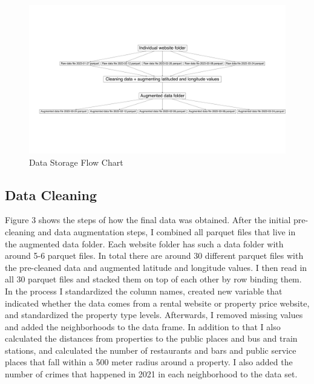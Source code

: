 \documentclass[
]{article}
\begin{document}
\begin{figure}
\centering
\includegraphics{final_report_files/figure-latex/unnamed-chunk-3-1.pdf}
\caption{Data Storage Flow Chart}
\end{figure}

\hypertarget{data-cleaning}{%
\subsection{Data Cleaning}\label{data-cleaning}}

Figure 3 shows the steps of how the final data was obtained. After the
initial pre-cleaning and data augmentation steps, I combined all parquet
files that live in the augmented data folder. Each website folder has
such a data folder with around 5-6 parquet files. In total there are
around 30 different parquet files with the pre-cleaned data and
augmented latitude and longitude values. I then read in all 30 parquet
files and stacked them on top of each other by row binding them. In the
process I standardized the column names, created new variable that
indicated whether the data comes from a rental website or property price
website, and standardized the property type levels. Afterwards, I
removed missing values and added the neighborhoods to the data frame. In
addition to that I also calculated the distances from properties to the
public places and bus and train stations, and calculated the number of
restaurants and bars and public service places that fall within a 500
meter radius around a property. I also added the number of crimes that
happened in 2021 in each neighborhood to the data set.
\end{document}
